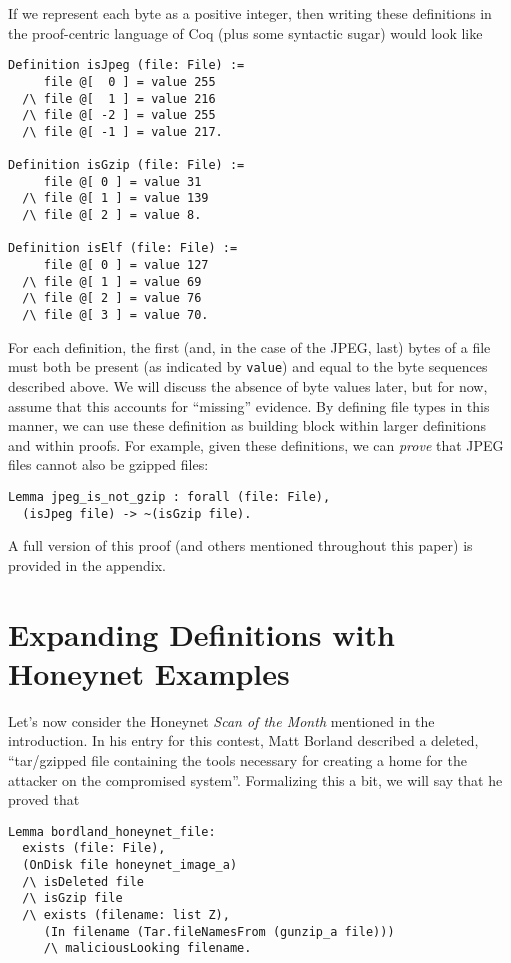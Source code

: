 \documentclass[nocopyrightspace]{sigplanconf}
\begin{document}
If we represent each byte as a positive integer, then writing these
definitions in the proof-centric language of Coq (plus some syntactic sugar)
would look like

\begin{lstlisting}
Definition isJpeg (file: File) :=
     file @[  0 ] = value 255
  /\ file @[  1 ] = value 216 
  /\ file @[ -2 ] = value 255
  /\ file @[ -1 ] = value 217.

Definition isGzip (file: File) :=
     file @[ 0 ] = value 31
  /\ file @[ 1 ] = value 139 
  /\ file @[ 2 ] = value 8.

Definition isElf (file: File) :=
     file @[ 0 ] = value 127
  /\ file @[ 1 ] = value 69 
  /\ file @[ 2 ] = value 76
  /\ file @[ 3 ] = value 70.
\end{lstlisting}

For each definition, the first (and, in the case of the JPEG, last) bytes of a
file must both be present (as indicated by {\tt value}) and equal to the byte
sequences described above. We will discuss the absence of byte values later,
but for now, assume that this accounts for ``missing'' evidence. By defining
file types in this manner, we can use these definition as building block
within larger definitions and within proofs. For example, given these
definitions, we can {\it prove} that JPEG files cannot also be gzipped files:

\begin{lstlisting}
Lemma jpeg_is_not_gzip : forall (file: File),
  (isJpeg file) -> ~(isGzip file).
\end{lstlisting}

A full version of this proof (and others mentioned throughout this paper) is
provided in the appendix.

\section{Expanding Definitions with Honeynet Examples}

Let's now consider the Honeynet {\it Scan of the Month} mentioned in the
introduction. In his entry for this contest, Matt 
Borland\cite{borland-honeynet} described a deleted, ``tar/gzipped file
containing the tools necessary for creating a home for the attacker on the
compromised system''. Formalizing this a bit, we will say that he proved that

\begin{lstlisting}
Lemma bordland_honeynet_file:
  exists (file: File),
  (OnDisk file honeynet_image_a)
  /\ isDeleted file
  /\ isGzip file
  /\ exists (filename: list Z),
     (In filename (Tar.fileNamesFrom (gunzip_a file)))
     /\ maliciousLooking filename.
\end{lstlisting}
\end{document}
